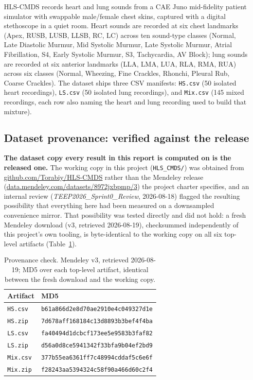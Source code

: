 \documentclass[11pt]{article}
\begin{document}
HLS-CMDS \cite{hlscmds} records heart and lung sounds from a CAE Juno
mid-fidelity patient simulator with swappable male/female chest skins,
captured with a digital stethoscope in a quiet room. Heart sounds are
recorded at six chest landmarks (Apex, RUSB, LUSB, LLSB, RC, LC) across ten
sound-type classes (Normal, Late Diastolic Murmur, Mid Systolic Murmur, Late
Systolic Murmur, Atrial Fibrillation, S4, Early Systolic Murmur, S3,
Tachycardia, AV Block); lung sounds are recorded at six anterior landmarks
(LLA, LMA, LUA, RLA, RMA, RUA) across six classes (Normal, Wheezing, Fine
Crackles, Rhonchi, Pleural Rub, Coarse Crackles). The dataset ships three
CSV manifests: \texttt{HS.csv} (50 isolated heart recordings),
\texttt{LS.csv} (50 isolated lung recordings), and \texttt{Mix.csv} (145
mixed recordings, each row also naming the heart and lung recording used to
build that mixture).

\subsection{Dataset provenance: verified against the release}
\label{sec:provenance}

\textbf{The dataset copy every result in this report is computed on is the
released one.} The working copy in this project (\texttt{HLS\_CMDS/}) was
obtained from
\href{https://github.com/Torabiy/HLS-CMDS}{github.com/Torabiy/HLS-CMDS}
rather than the Mendeley release
(\href{https://data.mendeley.com/datasets/8972jxbpmp/3}{data.mendeley.com/datasets/8972jxbpmp/3})
the project charter specifies, and an internal review
(\emph{TEEP2026\_Sprint0\_Review}, 2026-08-18) flagged the resulting
possibility that everything here had been measured on a downsampled
convenience mirror. That possibility was tested directly and did not hold: a
fresh Mendeley download (v3, retrieved 2026-08-19), checksummed independently
of this project's own tooling, is byte-identical to the working copy on all
six top-level artifacts (Table~\ref{tab:checksums}).

\begin{table}[H]
\centering
\caption{Provenance check. Mendeley v3, retrieved 2026-08-19; MD5 over each
top-level artifact, identical between the fresh download and the working
copy.}
\label{tab:checksums}
\begin{tabular}{@{}ll@{}}
\toprule
Artifact & MD5 \\
\midrule
\texttt{HS.csv} & \texttt{b61a866d2e8d70ae2910e4c049327d1e} \\
\texttt{HS.zip} & \texttt{7d678aff168184c13d8893b3bef4f4ba} \\
\texttt{LS.csv} & \texttt{fa40494d1dcbcf173ee5e9583b3faf82} \\
\texttt{LS.zip} & \texttt{d56a0d8ce5941342f33bfa9b04ef2bd9} \\
\texttt{Mix.csv} & \texttt{377b55ea6361ff7c48994cddaf5c6e6f} \\
\texttt{Mix.zip} & \texttt{f28243aa5394324c58f90a466d60c2f4} \\
\bottomrule
\end{tabular}
\end{table}
\end{document}
